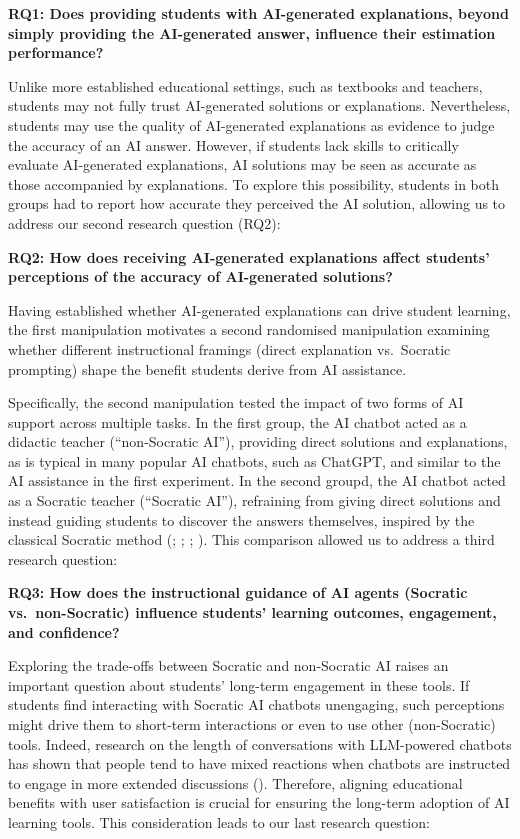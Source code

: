 \documentclass[
  12pt,
]{article}
\begin{document}
\textbf{RQ1: Does providing students with AI-generated explanations, beyond simply providing the AI-generated answer, influence their estimation performance?}

Unlike more established educational settings, such as textbooks and teachers, students may not fully trust AI-generated solutions or explanations. Nevertheless, students may use the quality of AI-generated explanations as evidence to judge the accuracy of an AI answer. However, if students lack skills to critically evaluate AI-generated explanations, AI solutions may be seen as accurate as those accompanied by explanations. To explore this possibility, students in both groups had to report how accurate they perceived the AI solution, allowing us to address our second research question (RQ2):

\textbf{RQ2: How does receiving AI-generated explanations affect students' perceptions of the accuracy of AI-generated solutions?}

Having established whether AI-generated explanations can drive student learning, the first manipulation motivates a second randomised manipulation examining whether different instructional framings (direct explanation vs.~Socratic prompting) shape the benefit students derive from AI assistance.

Specifically, the second manipulation tested the impact of two forms of AI support across multiple tasks. In the first group, the AI chatbot acted as a didactic teacher (``non-Socratic AI''), providing direct solutions and explanations, as is typical in many popular AI chatbots, such as ChatGPT, and similar to the AI assistance in the first experiment. In the second groupd, the AI chatbot acted as a Socratic teacher (``Socratic AI''), refraining from giving direct solutions and instead guiding students to discover the answers themselves, inspired by the classical Socratic method (; ; ; ). This comparison allowed us to address a third research question:

\textbf{RQ3: How does the instructional guidance of AI agents (Socratic vs.~non-Socratic) influence students' learning outcomes, engagement, and confidence?}

Exploring the trade-offs between Socratic and non-Socratic AI raises an important question about students' long-term engagement in these tools. If students find interacting with Socratic AI chatbots unengaging, such perceptions might drive them to short-term interactions or even to use other (non-Socratic) tools. Indeed, research on the length of conversations with LLM-powered chatbots has shown that people tend to have mixed reactions when chatbots are instructed to engage in more extended discussions (). Therefore, aligning educational benefits with user satisfaction is crucial for ensuring the long-term adoption of AI learning tools. This consideration leads to our last research question:
\end{document}
